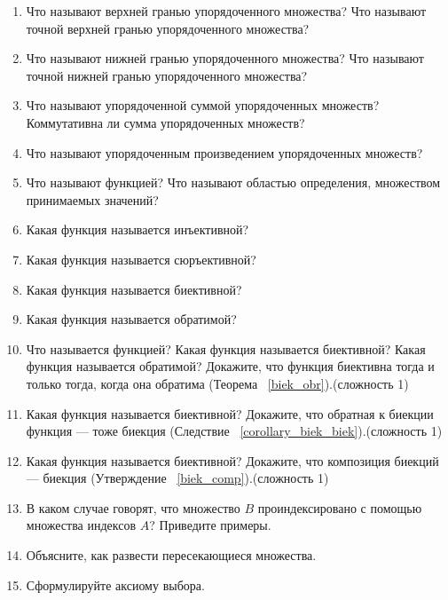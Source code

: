 \documentclass[12pt,oneside]{article}
\theoremstyle{definition}
\begin{document}
\begin{enumerate}
\item  Что называют верхней гранью упорядоченного множества? Что называют точной верхней гранью упорядоченного множества?

\item  Что называют нижней гранью упорядоченного множества? Что называют точной нижней гранью упорядоченного множества?

\item  Что называют упорядоченной суммой упорядоченных множеств? Коммутативна ли сумма упорядоченных множеств?

\item  Что называют упорядоченным произведением упорядоченных множеств? 

\item Что называют функцией? Что называют областью определения, множеством принимаемых значений? 

\item  Какая функция называется инъективной?

\item  Какая функция называется сюръективной?

\item  Какая функция называется биективной?

\item  Какая функция называется обратимой?

\item Что называется функцией? Какая функция называется биективной? Какая функция называется обратимой? Докажите, что функция биективна тогда и только тогда, когда она обратима (Теорема ~\ref{biek_obr}).(сложность 1)

\item Какая функция называется биективной? Докажите, что обратная к биекции функция --- тоже биекция (Следствие ~\ref{corollary_biek_biek}).(сложность 1)

\item  Какая функция называется биективной? Докажите, что композиция биекций --- биекция (Утверждение ~\ref{biek_comp}).(сложность 1)

\item  В каком случае говорят, что множество $B$ проиндексировано с помощью множества индексов $A$? Приведите примеры.

\item Объясните, как развести пересекающиеся множества.

\item Сформулируйте аксиому выбора. 


\end{enumerate}
\end{document}
